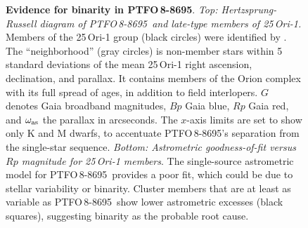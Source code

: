 \documentclass[12pt,twocolumn,tighten]{aastex62}
\newcommand{\ptfo}{PTFO$\,$8-8695}
\begin{document}
\begin{figure}[t]
	\begin{center}
		\leavevmode
		
		\vspace{-0.7cm}
	\end{center}
	\vspace{-0.7cm}
	\caption{ {\bf Evidence for binarity in \ptfo}.
    {\it Top: Hertzsprung-Russell diagram of \ptfo\ and late-type
    members of 25$\,$Ori-1.} Members of the 25$\,$Ori-1 group (black
    circles) were identified by \citet{kounkel_apogee2_2018}.  The
    ``neighborhood'' (gray circles) is non-member stars within 5
    standard deviations of the mean 25$\,$Ori-1 right ascension,
    declination, and parallax.  It contains members of the Orion
    complex with its full spread of ages, in addition to field
    interlopers.  $G$ denotes Gaia broadband magnitudes, $Bp$ Gaia
    blue, $Rp$ Gaia red, and $\omega_{\rm as}$ the parallax in
    arcseconds.  The $x$-axis limits are set to show only K and
    M dwarfs, to accentuate \ptfo's separation from the
    single-star sequence.  {\it Bottom: Astrometric goodness-of-fit
    versus $Rp$ magnitude for 25$\,$Ori-1 members}.  The single-source
    astrometric model for \ptfo\ provides a poor fit, which could be due to
    stellar variability or binarity.  Cluster members that
    are at least as variable as \ptfo\ show lower astrometric excesses
    (black squares), suggesting binarity as the probable root cause.
		\label{fig:gaia}
	}
\end{figure}
\end{document}
